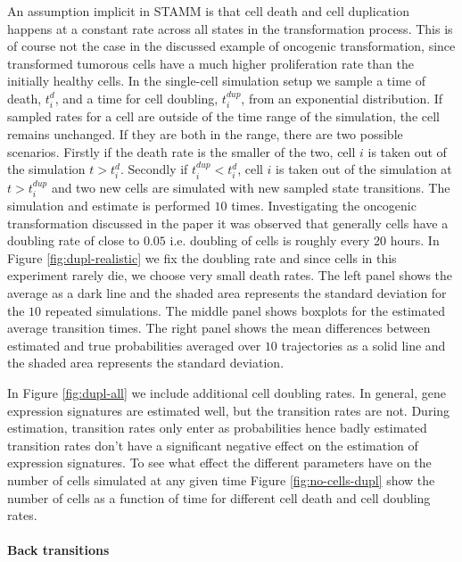 An assumption implicit in STAMM is that cell death and cell duplication happens at a constant rate across all states in the transformation process. This is of course not the case in the discussed example of oncogenic transformation, since transformed tumorous cells have a much higher proliferation rate than the initially healthy cells. In the single-cell simulation setup we sample a time of death, $t_i^{d}$, and a time for cell doubling, $t_i^{dup}$, from an exponential distribution. If sampled rates for a cell are outside of the time range of the simulation, the cell remains unchanged. If they are both in the range, there are two possible scenarios. Firstly if the death rate is the smaller of the two, cell $i$ is taken out of the simulation $t>t_i^d$. Secondly if $t_i^{dup}<t_i^d$, cell $i$ is taken out of the simulation at $t > t_i^{dup}$ and two new cells are simulated with new sampled state transitions. The simulation and estimate is performed $10$ times. Investigating the oncogenic transformation discussed in the paper it was observed that generally cells have a doubling rate of close to $0.05$ i.e. doubling of cells is roughly every 20 hours. In Figure \ref{fig:dupl-realistic} we fix the doubling rate and since cells in this experiment rarely die, we choose very small death rates. The left panel shows the average as a dark line and the shaded area represents the standard deviation for the $10$ repeated simulations. The middle panel shows boxplots for the estimated average transition times. The right panel shows the mean differences between estimated and true probabilities averaged over $10$ trajectories as a solid line and the shaded area represents the standard deviation.

In Figure \ref{fig:dupl-all} we include additional cell doubling rates. In general, gene expression signatures are estimated well, but the transition rates are not. During estimation, transition rates only enter as probabilities hence badly estimated transition rates don't have a significant negative effect on the estimation of expression signatures. To see what effect the different parameters have on the number of cells simulated at any given time Figure \ref{fig:no-cells-dupl} show the number of cells as a function of time for different cell death and cell doubling rates.



\paragraph{Back transitions}
\label{sec:back-transitions}

